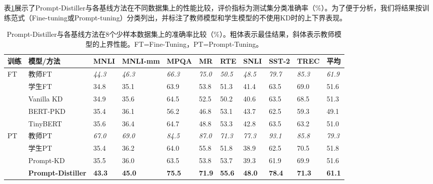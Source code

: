 \documentclass[../main.tex]{subfiles}
\begin{document}
\label{sec:3-5-2}
表\ref{tab:overall-results}展示了Prompt-Distiller与各基线方法在不同数据集上的性能比较，评价指标为测试集分类准确率（\%）。为了便于分析，我们将结果按训练范式（Fine-tuning或Prompt-tuning）分类列出，并标注了教师模型和学生模型的不使用KD时的上下界表现。

\begin{table}[htbp]
	\centering
	\caption{Prompt-Distiller与各基线方法在8个少样本数据集上的准确率比较（\%）。粗体表示最佳结果，斜体表示教师模型的上界性能。FT=Fine-Tuning，PT=Prompt-Tuning。}
	\label{tab:overall-results}
	\footnotesize\begin{tabularx}{1\textwidth}{X|l|*{8}{X}|X}
		\toprule[1pt]
		\textbf{训练} & \textbf{模型/方法}            & MNLI          & MNLI-mm       & MPQA          & MR            & RTE           & SNLI          & SST-2         & TREC          & 平均            \\
		\midrule[0.5pt]
		\multirow{5}{*}{FT}
		            & 教师FT                      & \textit{44.3} & \textit{46.3} & \textit{66.3} & \textit{75.0} & \textit{50.5} & \textit{48.5} & \textit{79.7} & \textit{85.3} & \textit{61.9} \\
		            & 学生FT                      & 34.8          & 35.1          & 63.9          & 53.8          & 51.3          & 41.4          & 63.5          & 69.0          & 51.6          \\
		\cline{2-11}
		            & Vanilla KD                & 34.9          & 35.6          & 64.5          & 52.5          & 50.2          & 40.6          & 63.5          & 68.5          & 51.3          \\
		            & BERT-PKD                  & 35.4          & 36.1          & 56.2          & 46.8          & 53.1          & 43.7          & 62.5          & 59.3          & 49.1          \\
		            & TinyBERT                  & 35.6          & 36.4          & 64.7          & 48.8          & 53.3          & 42.8          & 63.5          & 63.2          & 51.0          \\
		\midrule[0.5pt]
		\multirow{4}{*}{PT}
		            & 教师PT                      & \textit{67.0} & \textit{69.0} & \textit{84.5} & \textit{87.0} & \textit{71.3} & \textit{77.3} & \textit{93.1} & \textit{85.8} & \textit{79.3} \\
		            & 学生PT                      & 35.4          & 36.2          & 64.0          & 55.8          & 51.8          & 38.9          & 62.5          & 70.5          & 51.8          \\
		\cline{2-11}
		            & Prompt-KD                 & 35.5          & 36.0          & 63.5          & 53.8          & 53.7          & 39.3          & 61.9          & 69.9          & 51.6          \\
		\cline{2-11}
		            & \textbf{Prompt-Distiller} & \textbf{43.3} & \textbf{45.0} & \textbf{75.5} & \textbf{71.9} & \textbf{55.6} & \textbf{48.0} & \textbf{78.4} & \textbf{71.3} & \textbf{61.1} \\
		\bottomrule[1pt]
	\end{tabularx}
\end{table}
\end{document}
